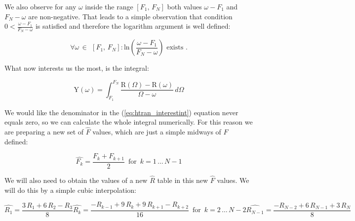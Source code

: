 \documentclass[12pt,twoside,a4paper]{article}
\numberwithin{equation}{subsection}
\numberwithin{figure}{subsection}
\begin{document}
We also observe for any $\omega$ inside the range $[F_1, \,F_N] $ both values $\omega  - F_1$ and $F_N - \omega$ are non-negative.
That leads to a simple observation that condition $0 < \frac {\omega - F_1}{F_N - \omega }$ is satisfied and therefore the logarithm
argument is well defined:

\begin{equation} \label{eq:htran_observations}
	\forall \omega \,\in\ \,[F_1, \,F_N] : \mathrm{ln}(\frac {\omega  - F_1}{F_N - \omega }) \text{ exists }.
\end{equation}

What now interests us the most, is the integral:

\begin{equation} \label{eq:htran_interestint} 
  \mathrm{Y}(\omega )=\int_{F_1}^{F_N}\frac {\mathrm{R}(\Omega ) - \mathrm{R}(\omega )}{\Omega  - \omega }\,d\Omega
\end{equation}


We would like the denominator in the (\ref{eq:htran_interestint}) equation never equals zero, so we can calculate the whole integral
numerically. For this reason we are preparing a new set of $\widehat{F}$ values, which are just a simple midways of $F$ defined:

\begin{equation} \label{eq:htran_newpoints}
  \widehat{F_{k}}=\frac {{F_{k}} + {F_{k + 1}}}{2} \,\mbox{ for } \, k = 1\,\ldots\,{N - 1}
\end{equation} 

We will also need to obtain the values of a new $\widehat{R}$ table in this new $\widehat{F}$  values. We will do this by a simple
cubic interpolation:

\begin{subequations} \label{eq:htran_r3interp}
  \begin{equation}   \label{eq:hr3inp_first}
    \widehat{R_{1}} = \frac {3\,{R_{1}} + 6\,{R_{2}} - {R_{3}}}{8}
  \end{equation}
  \begin{equation}   \label{eq:hr3inp_next}
    \widehat{R_{k}} = \frac { - {R_{k - 1}} + 9\,{R_{k}} + 9\,{R_{k + 1}} - {R_{k + 2}}}{16} \,\mbox{ for } \, k = 2\,\ldots\,{N - 2}
  \end{equation}
  \begin{equation}   \label{eq:hr3inp_last}
    \widehat{R_{N-1}} = \frac { - {R_{N - 2}} + 6\,{R_{N - 1}} + 3\,{R_{N}}}{8}
  \end{equation}
\end{subequations}
\end{document}
